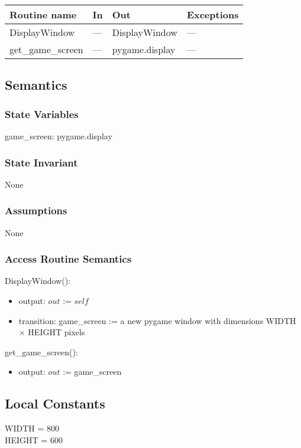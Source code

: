 \documentclass[12pt]{article}
\begin{document}
\begin{tabular}{| l | l | l | l |}
\hline
\textbf{Routine name} & \textbf{In} & \textbf{Out} & \textbf{Exceptions}\\
\hline
    DisplayWindow & --- & DisplayWindow & ---\\
\hline
    get\_game\_screen &--- & pygame.display & ---\\
\hline
\end{tabular}

\subsection* {Semantics}

\subsubsection* {State Variables}

game\_screen: pygame.display 

\subsubsection* {State Invariant}

None

\subsubsection* {Assumptions}

None

\subsubsection* {Access Routine Semantics}

DisplayWindow():
\begin{itemize}
    \item output: $out$ := $self$
    \item transition: game\_screen := a new pygame window with dimensions WIDTH $\times$ HEIGHT pixels
\end{itemize}
\noindent get\_game\_screen():
\begin{itemize}
    \item output: $out$ := game\_screen
\end{itemize}
\subsection* {Local Constants}
WIDTH = 800 \\
HEIGHT = 600 
\newpage
\end{document}
